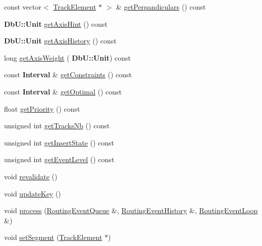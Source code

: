\begin{DoxyCompactItemize}
\item 
const vector$<$ \mbox{\hyperlink{classKite_1_1TrackElement}{Track\+Element}} $\ast$ $>$ \& \mbox{\hyperlink{classKite_1_1RoutingEvent_ab7d24e13f7b2c62cedce1fda2da7b7f5}{get\+Perpandiculars}} () const
\item 
\textbf{ Db\+U\+::\+Unit} \mbox{\hyperlink{classKite_1_1RoutingEvent_ab94e1b7e323c5344019d6ea545e3ea05}{get\+Axis\+Hint}} () const
\item 
\textbf{ Db\+U\+::\+Unit} \mbox{\hyperlink{classKite_1_1RoutingEvent_ad1c8d7db376d2e0b99eb1f54df29dc71}{get\+Axis\+History}} () const
\item 
long \mbox{\hyperlink{classKite_1_1RoutingEvent_aef5716e4b434aae813b1067a908f8b1a}{get\+Axis\+Weight}} (\textbf{ Db\+U\+::\+Unit}) const
\item 
const \textbf{ Interval} \& \mbox{\hyperlink{classKite_1_1RoutingEvent_a1bea8aed79a2ac4c726e49b93af3cd37}{get\+Constraints}} () const
\item 
const \textbf{ Interval} \& \mbox{\hyperlink{classKite_1_1RoutingEvent_a7dc0bafe113b8ec0c143ae4644ac79d4}{get\+Optimal}} () const
\item 
float \mbox{\hyperlink{classKite_1_1RoutingEvent_a391dd4b2a826c1d4713ef24ba25f687a}{get\+Priority}} () const
\item 
unsigned int \mbox{\hyperlink{classKite_1_1RoutingEvent_acd1128e75a441b654e6d881c495db4f7}{get\+Tracks\+Nb}} () const
\item 
unsigned int \mbox{\hyperlink{classKite_1_1RoutingEvent_a00f02910915e7deb857f023e5d584c08}{get\+Insert\+State}} () const
\item 
unsigned int \mbox{\hyperlink{classKite_1_1RoutingEvent_aebcd2884d8fa70256b0041b29e14404d}{get\+Event\+Level}} () const
\item 
void \mbox{\hyperlink{classKite_1_1RoutingEvent_a5bd93abe1416952ace15a98dbeeed124}{revalidate}} ()
\item 
void \mbox{\hyperlink{classKite_1_1RoutingEvent_a14468bece068cbc5221f057226ee8955}{update\+Key}} ()
\item 
void \mbox{\hyperlink{classKite_1_1RoutingEvent_a6add4f520081c698421481bf8fe0ad1f}{process}} (\mbox{\hyperlink{classKite_1_1RoutingEventQueue}{Routing\+Event\+Queue}} \&, \mbox{\hyperlink{classKite_1_1RoutingEventHistory}{Routing\+Event\+History}} \&, \mbox{\hyperlink{classKite_1_1RoutingEventLoop}{Routing\+Event\+Loop}} \&)
\item 
void \mbox{\hyperlink{classKite_1_1RoutingEvent_ae2eddb4497661b6319616a70c4acd165}{set\+Segment}} (\mbox{\hyperlink{classKite_1_1TrackElement}{Track\+Element}} $\ast$)

\end{DoxyCompactItemize}
